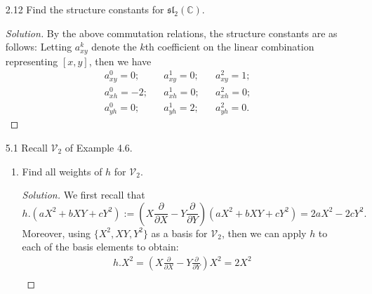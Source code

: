 \documentclass[12pt]{article}
\theoremstyle{definition}
\newenvironment{solution}
{\renewcommand\qedsymbol{$\blacksquare$}\begin{proof}[Solution]}
{\end{proof}}
\begin{document}
\begin{enumerate}
\begin{proof}
                and $y\in\mathfrak{sl}_n(\mathbb{C})$. We want to show that 
                $[x, y]\in\mathfrak{sl}_n(\mathbb{C})$. Thus we need that 
                $\text{tr}([x, y])=0$. By the fact that $\text{tr}(AB)=\text{tr}(BA)$ 
                for all $A, B\in\text{Mat}_{n\times n}(\mathbb{C})$, then we 
                have that $\text{tr}([x, y])=\text{tr}(xy)-\text{tr}(yx)=0$, as desired. 
            \end{proof}
        \item[2.12] Find the structure constants for
            $\mathfrak{sl}_{2}(\mathbb{C})$.
            \begin{solution}
                By the above commutation relations, the structure constants are
                as follows: Letting $a_{xy}^k$ denote the $k$th coefficient on
                the linear combination representing $[x, y]$, then we have
                \begin{align*}
                    &a_{xy}^0=0;& &a_{xy}^1=0;& &a_{xy}^2=1; \\
                    &a_{xh}^0=-2;& &a_{xh}^1=0;& &a_{xh}^2=0; \\
                    &a_{yh}^0=0;& &a_{yh}^1=2;& &a_{yh}^2=0.
                \end{align*}
            \end{solution}
        \item[5.1] Recall $\mathcal{V}_2$ of Example 4.6.
            \begin{enumerate}
                \item Find all weights of $h$ for $\mathcal{V}_2$.
                    \begin{solution}
                        We first recall that  
                        \begin{equation*}
                            h.(aX^2+bXY+cY^2):=(X\frac{\partial}{\partial
                            X}-Y\frac{\partial}{\partial
                        Y})(aX^2+bXY+cY^2)=2aX^2-2cY^2.
                        \end{equation*}
                        Moreover, using $\{X^2, XY, Y^2\}$ as a basis for
                        $\mathcal{V}_2$, then we can apply $h$ to each of the
                        basis elements to obtain:
                            \begin{align*}
                                &h.X^2 = (X\frac{\partial}{\partial
                                X}-Y\frac{\partial}{\partial Y})X^2 =2X^2& \\

\end{align*}
\end{solution}
\end{enumerate}
\end{enumerate}
\end{document}
